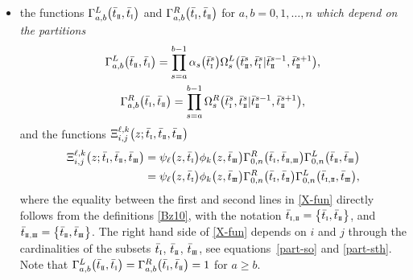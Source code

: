\documentclass[10pt,a4paper]{amsart}
\newcommand{\so}{\scriptscriptstyle \rm I}
\newcommand{\st}{\scriptscriptstyle \rm I\hspace{-1pt}I}
\newcommand{\sth}{\scriptscriptstyle \rm I\hspace{-1pt}I\hspace{-1pt}I}
\newcommand{\bt}{{\bar t}}
\theoremstyle{definition}
\def\r#1{\eqref{#1}}
\def\Oml{\Omega^L}
\def\Omr{\Omega^R}
\def\Gml{\Gamma^L}
\def\Gmr{\Gamma^R}
\begin{document}
\begin{itemize}
\begin{gather}
\begin{cases}
\end{cases}\label{part-sth}
\\
\big|\bt^s_{\st}\big|=|\bt^s|-\big|\bt^s_{\so}\big|-\big|\bt^s_{\sth}\big| ,\label{part-st}
\end{gather}
\item the functions $\Gml_{a,b}\bigl(\bt_{\st},\bt_{\so}\bigr)$
and $\Gmr_{a,b}\bigl(\bt_{\so},\bt_{\st}\bigr)$
for $a,b=0,1,\dots,n$
\textit{which depend on the partitions}
\begin{gather*}%
\Gml_{a,b}\bigl(\bt_{\st},\bt_{\so}\bigr)
=\prod_{s=a}^{b-1}\alpha_s\bigl(\bt^s_{\so}\bigr)\Oml_s\bigl(\bt^s_{\st},\bt^s_{\so}|\bt^{s-1}_{\st},\bt^{s+1}_{\st}\bigr),\\
\Gmr_{a,b}\bigl(\bt_{\so},\bt_{\st}\bigr)
=\prod_{s=a}^{b-1}\Omr_s\bigl(\bt^s_{\so},\bt^s_{\st}|\bt^{s-1}_{\st},\bt^{s+1}_{\st}\bigr),
\end{gather*}
and the functions $\Xi^{\ell,k}_{i,j}\bigl(z;\bt_{\so},\bt_{\st},\bt_{\sth}\bigr)$
\begin{align}
\Xi^{\ell,k}_{i,j}\bigl(z;\bt_{\so},\bt_{\st},\bt_{\sth}\bigr)&=
\psi_\ell\bigl(z,\bt_{\so}\bigr) \phi_k\bigl(z,\bt_{\sth}\bigr) \Gmr_{0,n}\bigl(\bt_{\so},\bt_{{\st},{\sth}}\bigr)
\Gml_{0,n}\bigl(\bt_{\st},\bt_{{\sth}}\bigr)\nonumber\\
& =
\psi_\ell\bigl(z,\bt_{\so}\bigr) \phi_k\bigl(z,\bt_{\sth}\bigr)
\Gmr_{0,n}\bigl(\bt_{\so},\bt_{{\st}}\bigr)
\Gml_{0,n}\bigl(\bt_{{\so},{\st}},\bt_{{\sth}}\bigr) ,\label{X-fun}
\end{align}
where the equality between the first and second lines in \r{X-fun}
directly follows from the definitions \r{Bz10},
with the notation $\bt_{\so,\st} = \bigl\{\bt_{\so}, \bt_{\st}\bigr\}$, and $\bt_{\st,\sth} = \bigl\{\bt_{\st}, \bt_{\sth}\bigr\}$.
The right hand side of \eqref{X-fun} depends on $i$ and $j$ through the cardinalities of the subsets $\bt_{\so}$, $\bt_{{\st}}$, $\bt_{{\sth}}$, see equations~\eqref{part-so} and \eqref{part-sth}.
Note that $\Gml_{a,b}\bigl(\bt_{\st},\bt_{\so}\bigr)=\Gmr_{a,b}\bigl(\bt_{\so},\bt_{\st}\bigr) = 1$
for $a\geq b$.
\end{itemize}
\end{document}
